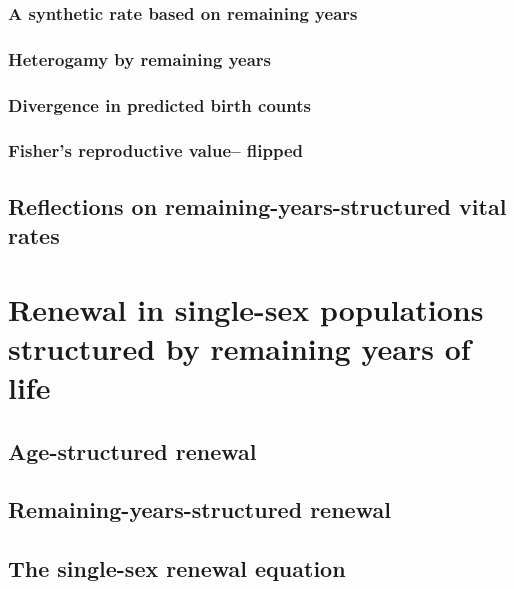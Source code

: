     \subsection{A synthetic rate based on remaining years}
      
    
    \subsection{Heterogamy by remaining years}
      
      
    \subsection{Divergence in predicted birth counts}
      
    \subsection{Fisher's reproductive value-- flipped}
      
  \section{Reflections on remaining-years-structured vital rates}
      

  \chapter{Renewal in single-sex populations structured by remaining years of
life}
    
    \section{Age-structured renewal}
      
    \section{Remaining-years-structured renewal}
      
    \section{The single-sex renewal equation}
      
